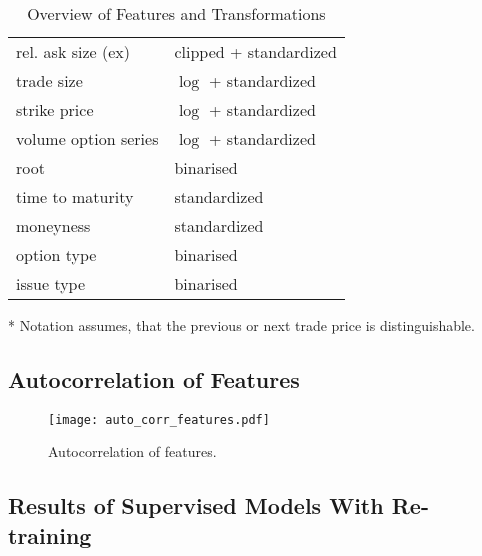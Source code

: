 \begin{table}[H]
\begin{threeparttable}
\begin{tabular}{@{}ll@{}}
            rel. ask size (ex)      & clipped + standardized \\
            trade size              & $\log$ + standardized  \\
            strike price            & $\log$ + standardized  \\
            volume option series    & $\log$ + standardized  \\
            root                    & binarised              \\
            time to maturity        & standardized           \\
            moneyness               & standardized           \\
            option type             & binarised              \\
            issue type              & binarised              \\ \bottomrule
        \end{tabular}
        \begin{tablenotes}\footnotesize
            \item[*] Notation assumes, that the previous or next trade price is distinguishable.
        \end{tablenotes}
    \end{threeparttable}
    \caption[Overview of Features and Transformations]{Overview of Features and Transformations}
    \label{tab:features-transformations}
\end{table}

\newpage
\subsection{Autocorrelation of Features}
\label{app:autocorrelation-of-features}

\begin{figure}[ht]
    \centering
    \texttt{[image: auto\_corr\_features.pdf]}
    \caption[Autocorrelation of Features]{Autocorrelation of features.}
    \label{fig:auto-correlation-features}
\end{figure}

\newpage
\subsection{Results of Supervised Models With Re-training}
\label{app:results-of-supervised-models-with-re-training}

